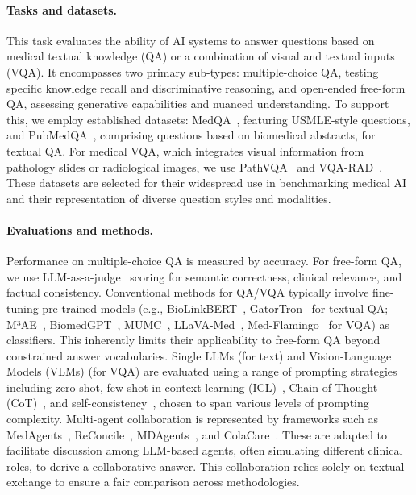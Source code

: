 \documentclass{article}
\begin{document}
\paragraph{Tasks and datasets.} This task evaluates the ability of AI systems to answer questions based on medical textual knowledge (QA) or a combination of visual and textual inputs (VQA). It encompasses two primary sub-types: multiple-choice QA, testing specific knowledge recall and discriminative reasoning, and open-ended free-form QA, assessing generative capabilities and nuanced understanding. To support this, we employ established datasets: MedQA~\cite{jin2021medqa}, featuring USMLE-style questions, and PubMedQA~\cite{jin2019pubmedqa}, comprising questions based on biomedical abstracts, for textual QA. For medical VQA, which integrates visual information from pathology slides or radiological images, we use PathVQA~\cite{he2020pathvqa} and VQA-RAD~\cite{lau2018VQA_RAD}. These datasets are selected for their widespread use in benchmarking medical AI and their representation of diverse question styles and modalities.

\paragraph{Evaluations and methods.} Performance on multiple-choice QA is measured by accuracy. For free-form QA, we use LLM-as-a-judge~\cite{zheng2023llm_as_a_judge} scoring for semantic correctness, clinical relevance, and factual consistency. Conventional methods for QA/VQA typically involve fine-tuning pre-trained models (e.g., BioLinkBERT~\cite{yasunaga2022linkbert}, GatorTron~\cite{yang2022gatortron} for textual QA; M³AE~\cite{chen2022m3ae}, BiomedGPT~\cite{zhang2024biomedgpt}, MUMC~\cite{li2023mumc}, LLaVA-Med~\cite{li2023llavamed}, Med-Flamingo~\cite{moor2023medflamingo} for VQA) as classifiers. This inherently limits their applicability to free-form QA beyond constrained answer vocabularies. Single LLMs (for text) and Vision-Language Models (VLMs) (for VQA) are evaluated using a range of prompting strategies including zero-shot, few-shot in-context learning (ICL)~\cite{dong2022icl_survey}, Chain-of-Thought (CoT)~\cite{wei2022cot}, and self-consistency~\cite{wang2023selfconsistency}, chosen to span various levels of prompting complexity. Multi-agent collaboration is represented by frameworks such as MedAgents~\cite{tang2024medagents}, ReConcile~\cite{chen2024reconcile}, MDAgents~\cite{kim2024mdagents}, and ColaCare~\cite{wang2025colacare}. These are adapted to facilitate discussion among LLM-based agents, often simulating different clinical roles, to derive a collaborative answer. This collaboration relies solely on textual exchange to ensure a fair comparison across methodologies.
\end{document}
